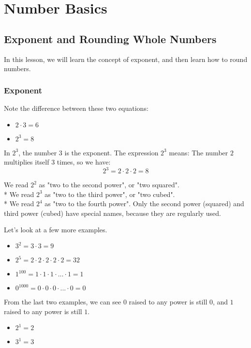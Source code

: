 \chapter{Number Basics}
\section{Exponent and Rounding Whole Numbers}


In this lesson, we will learn the concept of exponent, and then learn how to round numbers.

\subsection{Exponent}
Note the difference between these two equations:
\begin{itemize}
\item $2\cdot 3=6$
\item $2^{3}=8$
\end{itemize}

In $2^{3}$, the number $3$ is the exponent. The expression $2^{3}$ means: The number $2$ multiplies itself $3$ times, so we have:
\[ 2^{3}=2 \cdot 2 \cdot 2 = 8 \]

We read $2^{2}$ as "two to the second power", or "two squared".\\*
We read $2^{3}$ as "two to the third power", or "two cubed".\\*
We read $2^{4}$ as "two to the fourth power". Only the second power (squared) and third power (cubed) have special names, because they are regularly used.

Let's look at a few more examples.

\begin{myexample}
\begin{itemize}
\item $3^{2}=3\cdot 3=9$
\item $2^{5}=2\cdot 2\cdot 2\cdot 2\cdot 2=32$
\item $1^{100}=1\cdot 1\cdot 1 \cdot ... \cdot 1=1$
\item $0^{1000}=0\cdot 0\cdot 0 \cdot ... \cdot 0=0$
\end{itemize}
\end{myexample}

From the last two examples, we can see $0$ raised to any power is still $0$, and $1$ raised to any power is still $1$.

\begin{myexample}
\begin{itemize}
\item $2^{1}=2$
\item $3^{1}=3$
\end{itemize}
\end{myexample}

